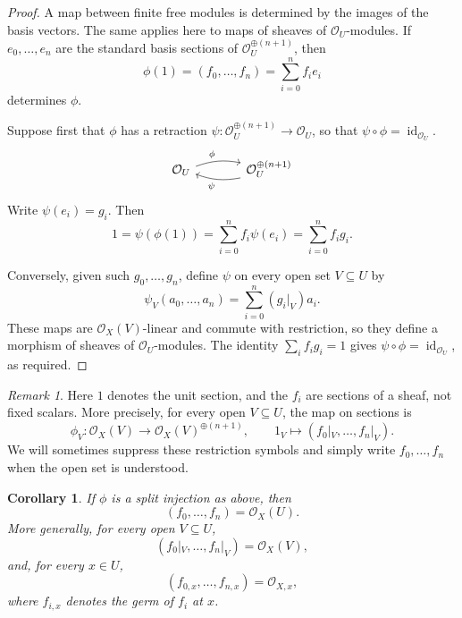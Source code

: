 \documentclass{article}
\theoremstyle{definition}
\theoremstyle{remark}
\newtheorem{remark}{Remark}[section]
\theoremstyle{plain}
\newtheorem{corollary}{Corollary}[section]
\begin{document}
\begin{proof}
    A map between finite free modules is determined by the images of the
    basis vectors. The same applies here to maps of sheaves of
    \(\mathcal{O}_U\)-modules. If \(e_0,\dots,e_n\) are the standard basis
    sections of \(\mathcal{O}_U^{\oplus(n+1)}\), then
    \[
        \phi(1)=(f_0,\dots,f_n)=\sum_{i=0}^n f_i e_i
    \]
    determines \(\phi\).

    Suppose first that \(\phi\) has a retraction
    \(\psi:\mathcal{O}_U^{\oplus(n+1)}\to\mathcal{O}_U\), so that
    \(\psi\circ\phi=\operatorname{id}_{\mathcal{O}_U}\).
    \[
    \begin{tikzcd}[column sep=large]
        \mathcal{O}_U \arrow[r,"\phi",bend left=15]
        & \mathcal{O}_U^{\oplus(n+1)}
            \arrow[l,"\psi",bend left=15]
    \end{tikzcd}
    \]
    Write \(\psi(e_i)=g_i\). Then
    \[
        1=\psi(\phi(1))
        =\sum_{i=0}^n f_i\psi(e_i)
        =\sum_{i=0}^n f_i g_i.
    \]

    Conversely, given such \(g_0,\dots,g_n\), define \(\psi\) on every open
    set \(V\subseteq U\) by
    \[
        \psi_V(a_0,\dots,a_n)
        =\sum_{i=0}^n (g_i|_V)a_i.
    \]
    These maps are \(\mathcal{O}_X(V)\)-linear and commute with restriction,
    so they define a morphism of sheaves of \(\mathcal{O}_U\)-modules.
    The identity \(\sum_i f_i g_i=1\) gives
    \(\psi\circ\phi=\operatorname{id}_{\mathcal{O}_U}\), as required.
\end{proof}

\begin{remark}\label{rem:lsi-sections}
    Here \(1\) denotes the unit section, and the \(f_i\) are sections of a
    sheaf, not fixed scalars. More precisely, for every open
    \(V\subseteq U\), the map on sections is
    \[
        \phi_V:\mathcal{O}_X(V)
        \longrightarrow\mathcal{O}_X(V)^{\oplus(n+1)},
        \qquad
        1_V\longmapsto(f_0|_V,\dots,f_n|_V).
    \]
    We will sometimes suppress these restriction symbols and simply write
    \(f_0,\dots,f_n\) when the open set is understood.
\end{remark}

\begin{corollary}\label{cor:lsi-unit-ideal}
    If \(\phi\) is a split injection as above, then
    \[
        (f_0,\dots,f_n)=\mathcal{O}_X(U).
    \]
    More generally, for every open \(V\subseteq U\),
    \[
        (f_0|_V,\dots,f_n|_V)=\mathcal{O}_X(V),
    \]
    and, for every \(x\in U\),
    \[
        (f_{0,x},\dots,f_{n,x})=\mathcal{O}_{X,x},
    \]
    where \(f_{i,x}\) denotes the germ of \(f_i\) at \(x\).
\end{corollary}
\end{document}
